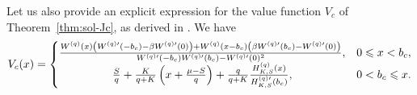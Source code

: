 \documentclass[11pt,reqno]{amsart}
\newcommand{\Wq}{W^{(q)}}
\newcommand{\Wqprime}{W^{(q) \prime}}
\newcommand{\Hq}{H^{(q)}_{K,S}}
\newcommand{\Hqprime}{H^{(q) \prime}_{K,S}}
\newcommand{\ettap}[1]{\frac{S}{q} + \frac{K}{q+K}\left(#1 + \frac{\mu - S}{q}\right)}
\renewcommand{\leq}{\leqslant}
\begin{document}
Let us also provide an explicit expression for the value function $V_c$ of Theorem~\ref{thm:sol-Jc}, as derived in \cite{mastromonaco_2025, renaud-et-al_2023}. We have
   \begin{equation}\label{Vc-expli}
        V_c(x) =
        \begin{cases}
            \frac{\Wq(x)\left(\Wqprime (-b_c)-\beta \Wqprime (0)\right) + \Wq(x-b_c)\left(\beta \Wqprime (b_c) - \Wqprime (0)\right)}{\Wqprime (-b_c) \Wqprime (b_c) - \Wqprime (0)^2}, &0\leq x< b_c, \\
            \hfil \ettap{x} + \frac{q}{q+K}\frac{\Hq(x)}{\Hqprime (b_c)}, &0 < b_c \leq x.
        \end{cases}
    \end{equation}
\end{document}
